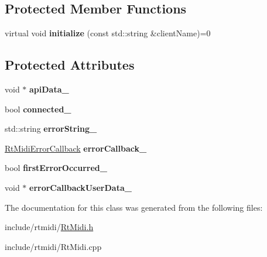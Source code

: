 \subsection*{Protected Member Functions}
\begin{DoxyCompactItemize}
\item 
virtual void {\bfseries initialize} (const std\+::string \&client\+Name)=0\hypertarget{class_midi_api_ab323e8b2789ce47ad0985d136ad6851d}{}\label{class_midi_api_ab323e8b2789ce47ad0985d136ad6851d}

\end{DoxyCompactItemize}
\subsection*{Protected Attributes}
\begin{DoxyCompactItemize}
\item 
void $\ast$ {\bfseries api\+Data\+\_\+}\hypertarget{class_midi_api_a5708c9051060b961ee1b69d053314dcd}{}\label{class_midi_api_a5708c9051060b961ee1b69d053314dcd}

\item 
bool {\bfseries connected\+\_\+}\hypertarget{class_midi_api_a2caa246b04594b5ae84bacccb2a648aa}{}\label{class_midi_api_a2caa246b04594b5ae84bacccb2a648aa}

\item 
std\+::string {\bfseries error\+String\+\_\+}\hypertarget{class_midi_api_a6bff6ace3f6e863be6cde261a6f2f114}{}\label{class_midi_api_a6bff6ace3f6e863be6cde261a6f2f114}

\item 
\hyperlink{_rt_midi_8h_a57641d3490f722c3efb9ee1c640e36bb}{Rt\+Midi\+Error\+Callback} {\bfseries error\+Callback\+\_\+}\hypertarget{class_midi_api_a4f9fbf86cd9a970ff6e7211d73d6594d}{}\label{class_midi_api_a4f9fbf86cd9a970ff6e7211d73d6594d}

\item 
bool {\bfseries first\+Error\+Occurred\+\_\+}\hypertarget{class_midi_api_a4d2ee5d79440913ab6b64d38b402c408}{}\label{class_midi_api_a4d2ee5d79440913ab6b64d38b402c408}

\item 
void $\ast$ {\bfseries error\+Callback\+User\+Data\+\_\+}\hypertarget{class_midi_api_a25be898d4cfd92d8221d5b2aeaffe051}{}\label{class_midi_api_a25be898d4cfd92d8221d5b2aeaffe051}

\end{DoxyCompactItemize}


The documentation for this class was generated from the following files\+:\begin{DoxyCompactItemize}
\item 
include/rtmidi/\hyperlink{_rt_midi_8h}{Rt\+Midi.\+h}\item 
include/rtmidi/Rt\+Midi.\+cpp\end{DoxyCompactItemize}
